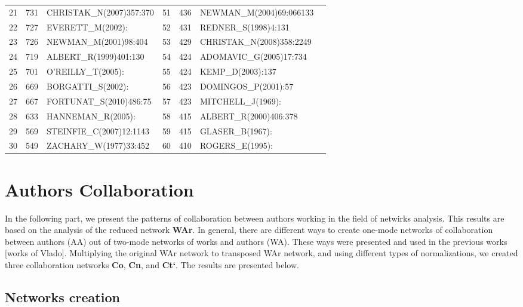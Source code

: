\documentclass[11pt]{article} %
\begin{document}
\begin{table}
\begin{tabular}{c|c|l||c|c|l|l}
21&   	731&   	CHRISTAK\_N(2007)357:370&   	51&   	436&   	NEWMAN\_M(2004)69:066133\\
22&   	727&   	EVERETT\_M(2002):&   	52&   	431&   	REDNER\_S(1998)4:131\\
23&   	726&   	NEWMAN\_M(2001)98:404&   	53&   	429&   	CHRISTAK\_N(2008)358:2249\\
24&   	719&   	ALBERT\_R(1999)401:130&   	54&   	424&   	ADOMAVIC\_G(2005)17:734\\
25&   	701&   	O'REILLY\_T(2005):&   	55&   	424&   	KEMP\_D(2003):137\\
26&   	669&   	BORGATTI\_S(2002):&   	56&   	423&   	DOMINGOS\_P(2001):57\\
27&   	667&   	FORTUNAT\_S(2010)486:75&   	57&   	423&   	MITCHELL\_J(1969):\\
28&   	633&   	HANNEMAN\_R(2005):&   	58&   	415&   	ALBERT\_R(2000)406:378\\
29&   	569&   	STEINFIE\_C(2007)12:1143&   	59&   	415&   	GLASER\_B(1967):\\
30&   	549&   	ZACHARY\_W(1977)33:452&   	60&   	410&   	ROGERS\_E(1995):\\ \hline
\end{tabular}
\end{table}




\section{Authors Collaboration}  

In the following part, we present the patterns of collaboration between authors working in the field of netwirks analysis. This results are based on the analysis of the reduced network \textbf{WAr}. In general, there are different ways to create one-mode networks of collaboration between authors (AA) out of two-mode networks of works and authors (WA). These ways were presented and used in the previous works [works of Vlado]. Multiplying the original WAr network to transposed WAr network, and using different types of normalizations, we created three collaboration networks \textbf{Co}, \textbf{Cn}, and \textbf{Ct`}. The results are presented below. \medskip  

\subsection{Networks creation}  
\end{document}

